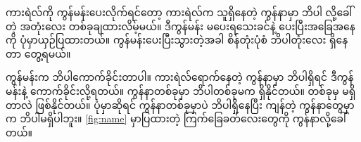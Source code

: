 \begin{sloppypar}
ကားရဲလ်ကို  ကွန်မန်းပေးလိုက်ရင်တော့ ကားရဲလ်က သူရှိနေတဲ့ ကွန်နာမှာ ဘိပါ လို့ခေါ်တဲ့ အတုံးလေး တစ်ခုချထားလိမ့်မယ်။ ဒီကွန်မန်း မပေးရသေးခင်နဲ့ ပေးပြီးအခြေအနေကို ပုံမှာယှဉ်ပြထားတယ်။ ကွန်မန်းပေးပြီးသွားတဲ့အခါ စိန်တုံးပုံစံ ဘိပါတုံးလေး ရှိနေတာ တွေ့ရမယ်။ 

 ကွန်မန်းက ဘိပါကောက်ခိုင်းတာပါ။ ကားရဲလ်ရောက်နေတဲ့ ကွန်နာမှာ ဘိပါရှိရင် ဒီကွန်မန်းနဲ့ ကောက်ခိုင်းလို့ရတယ်။ ကွန်နာတစ်ခုမှာ ဘိပါတစ်ခုမက ရှိနိုင်တယ်။ တစ်ခုမှ မရှိတာလဲ ဖြစ်နိုင်တယ်။ ပုံမှာဆိုရင် ကွန်နာတစ်ခုမှာပဲ ဘိပါရှိနေပြီး ကျန်တဲ့ ကွန်နာတွေမှာက ဘိပါမရှိပါဘူး။ \Fig\vref*{fig:name} မှာပြထားတဲ့ ကြက်ခြေခတ်လေးတွေကို ကွန်နာလို့ခေါ်တယ်။ 

\end{sloppypar}
